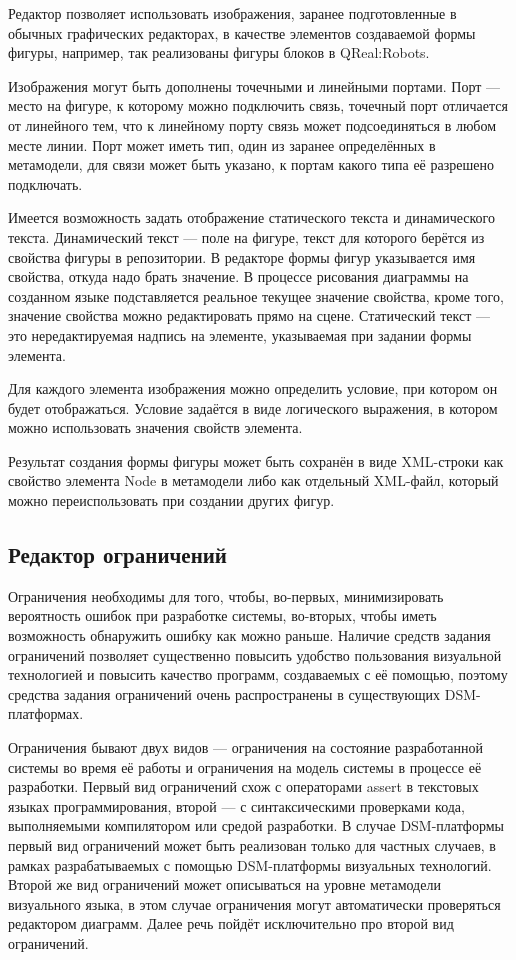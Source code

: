 Редактор позволяет использовать изображения, заранее подготовленные в обычных графических 
редакторах, в качестве элементов создаваемой формы фигуры, например, так реализованы 
фигуры блоков в QReal:Robots. 

Изображения могут быть дополнены точечными и линейными портами. Порт --- место на 
фигуре, к которому можно подключить связь, точечный порт отличается от линейного тем, 
что к линейному порту связь может подсоединяться в любом месте линии. Порт может иметь 
тип, один из заранее определённых в метамодели, для связи может быть указано, к портам 
какого типа её разрешено подключать.

Имеется возможность задать отображение статического текста и динамического текста. 
Динамический текст --- поле на фигуре, текст для которого берётся из свойства фигуры в 
репозитории. В редакторе формы фигур указывается имя свойства, откуда надо брать значение. 
В процессе рисования диаграммы на созданном языке подставляется 
реальное текущее значение свойства, кроме того, значение свойства можно редактировать 
прямо на сцене. Статический текст --- это нередактируемая надпись на элементе, указываемая
при задании формы элемента. 

Для каждого элемента изображения можно определить условие, при котором он будет отображаться. 
Условие задаётся в виде логического выражения, в котором можно использовать значения 
свойств элемента. 

Результат создания формы фигуры может быть сохранён в виде XML-строки как свойство 
элемента Node в метамодели либо как отдельный XML-файл, который можно переиспользовать 
при создании других фигур.

\subsection{Редактор ограничений}
Ограничения необходимы для того, чтобы, во-первых, минимизировать вероятность ошибок 
при разработке системы, во-вторых, чтобы иметь возможность обнаружить ошибку как можно 
раньше. Наличие средств задания ограничений позволяет существенно повысить удобство 
пользования визуальной технологией и повысить качество программ, создаваемых с её помощью, 
поэтому средства задания ограничений очень распространены в существующих \ac{DSM}-платформах. 

Ограничения бывают двух видов --- ограничения на состояние разработанной системы во 
время её работы и ограничения на модель системы в процессе её разработки. Первый 
вид ограничений схож с операторами assert в текстовых языках программирования, второй --- 
с синтаксическими проверками кода, выполняемыми компилятором или средой разработки. 
В случае \ac{DSM}-платформы первый вид ограничений может быть реализован только для частных 
случаев, в рамках разрабатываемых с помощью \ac{DSM}-платформы визуальных технологий. Второй 
же вид ограничений может описываться на уровне метамодели визуального языка, в этом 
случае ограничения могут автоматически проверяться редактором диаграмм. Далее речь 
пойдёт исключительно про второй вид ограничений.

